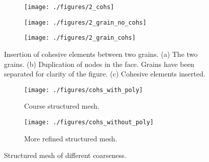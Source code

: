 \documentclass[generate_interface_elements.tex]{subfiles}
\begin{document}
\begin{figure}
\centering
\begin{subfigure}[b]{.4\textwidth}
  \centering
  \texttt{[image: ./figures/2\_cohs]}
  \caption{}
  \label{fig:cohs_2_a}
\end{subfigure}%
\hspace{-10mm}
\begin{subfigure}[b]{.4\textwidth}
  \centering
  \texttt{[image: ./figures/2\_grain\_no\_cohs]}
  \caption{}
  \label{fig:cohs_2_b}
\end{subfigure}%
\hspace{-10mm}
\begin{subfigure}[b]{.4\textwidth}
  \centering
  \texttt{[image: ./figures/2\_grain\_cohs]}
  \caption{}
  \label{fig:cohs_2_c}
\end{subfigure}
\caption{Insertion of cohesive elements between two grains. (a) The two grains. (b) Duplication of nodes in the face. Grains have been separated for clarity of the figure. (c) Cohesive elements inserted. }
\label{fig:cohs_2}
\end{figure}



\begin{figure}
\centering
\begin{subfigure}[b]{.5\textwidth}
  \centering
  \texttt{[image: ./figures/cohs\_with\_poly]}
  \caption{Course structured mesh.}
  \label{fig:cohs_large_a}
\end{subfigure}%
\begin{subfigure}[b]{.5\textwidth}
  \centering
  \texttt{[image: ./figures/cohs\_without\_poly]}
  \caption{More refined structured mesh.}
  \label{fig:cohs_large_b}
\end{subfigure}
\caption{Structured mesh of different coarseness.}
\label{fig:cohs_large}
\end{figure}
\end{document}
